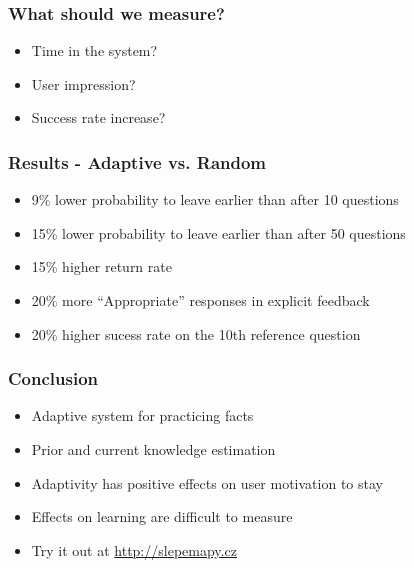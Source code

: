 \documentclass[xcolor=svgnames]{beamer}
\begin{document}
\begin{frame}
	\frametitle{What should we measure?}
  \begin{itemize}
    \item Time in the system? 
    \item User impression? 
    \item Success rate increase?
    \
  \end{itemize}
\end{frame}
\begin{frame}
	\frametitle{Results - Adaptive vs. Random}
  \begin{itemize}
    \item 9\% lower probability to leave earlier than after 10 questions
    \item 15\% lower probability to leave earlier than after 50 questions
    \item 15\% higher return rate 
    \item 20\% more ``Appropriate'' responses in explicit feedback
    \item 20\% higher sucess rate on the 10th reference question
    \
  \end{itemize}
\end{frame}
\begin{frame}
	\frametitle{Conclusion}
  \begin{itemize}
    \item Adaptive system for practicing facts 
    \item Prior and current knowledge estimation
    \item Adaptivity has positive effects on user motivation to stay
    \item Effects on learning are difficult to measure
    \item Try it out at \url{http://slepemapy.cz}
    \
  \end{itemize}
\end{frame}
\end{document}
